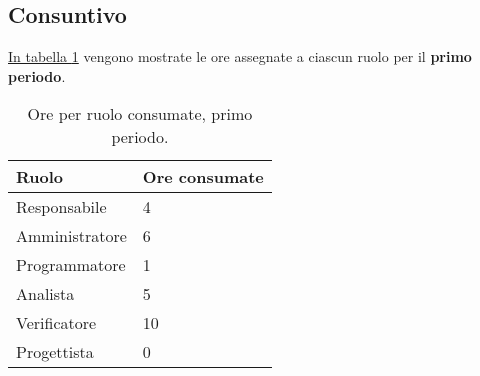 \subsection{Consuntivo}

\label{sec:Consuntivo_PrimoPeriodo}

\hyperref[tab:consuntivo_primo_periodo]{In tabella \ref{tab:consuntivo_primo_periodo}} vengono mostrate le ore assegnate a ciascun ruolo per il \textbf{primo periodo}.
\begin{table}[!h]
    \centering
    \begin{tabular}{| l | l |}
    \hline
        \textbf{Ruolo} & 
        \textbf{Ore consumate}\\
    \hline
        Responsabile & 4\\
    \hline
        Amministratore & 6\\
    \hline
        Programmatore & 1\\
    \hline
        Analista & 5\\
    \hline
        Verificatore & 10\\
    \hline
        Progettista & 0\\
    \hline
    \end{tabular}
    \caption{Ore per ruolo consumate, primo periodo.}
    \label{tab:consuntivo_primo_periodo} 
\end{table}

